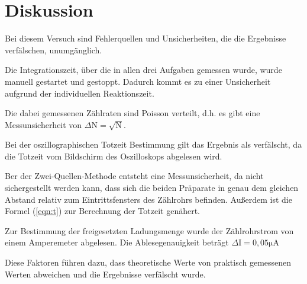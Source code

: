 \section{Diskussion}
Bei diesem Versuch sind Fehlerquellen und Unsicherheiten, die die Ergebnisse verfälschen, unumgänglich.

\noindent
Die Integrationszeit, über die in allen drei Aufgaben gemessen wurde, wurde manuell gestartet und gestoppt.
Dadurch kommt es zu einer Unsicherheit aufgrund der individuellen Reaktionszeit.

\noindent
Die dabei gemessenen Zählraten sind Poisson verteilt, d.h. es gibt eine Messunsicherheit von $\Delta\text{N}=\sqrt{\text{N}}$.

\noindent
Bei der oszillographischen Totzeit Bestimmung gilt das Ergebnis als verfälscht, da die Totzeit vom Bildschirm des Oszilloskops abgelesen wird.

\noindent
Ber der Zwei-Quellen-Methode entsteht eine Messunsicherheit, da nicht sichergestellt werden kann, dass sich die beiden Präparate in genau dem gleichen Abstand relativ zum Eintrittsfensters des Zählrohrs befinden.
Außerdem ist die Formel (\ref{eqn:t}) zur Berechnung der Totzeit genähert.

\noindent
Zur Bestimmung der freigesetzten Ladungsmenge wurde der Zählrohrstrom von einem Amperemeter abgelesen.
Die Ablesegenauigkeit beträgt $\Delta\text{I}=0,05\si{\micro\ampere}$

\noindent
Diese Faktoren führen dazu, dass theoretische Werte von praktisch gemessenen Werten abweichen und die Ergebnisse verfälscht wurde.


